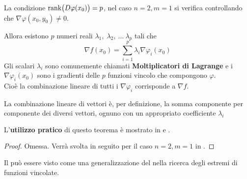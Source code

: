 \begin{theorem}
\begin{note}
	\end{note}
	\begin{note}
		La condizione $\operatorname{rank} \bigl( D\varphi(x_0) \bigr) = p$, nel caso $n = 2, m = 1$ si verifica controllando che $\nabla \varphi (x_0, y_0) \neq 0$.
	\end{note}
	Allora esistono $p$ numeri reali $\lambda_1,\; \lambda_2,\:\dotsc\:\lambda_p$ tali che
	\begin{equation}
		\label{eq:eqiv_nabl_molt_lagr}
		\nabla f(x_0) = \sum\limits_{i = 1}^{p} \lambda_i \nabla \varphi_i (x_0)
	\end{equation}
	Gli scalari $\lambda_i$ sono comunemente chiamati \textbf{Moltiplicatori di Lagrange} e i $\nabla \varphi_i (x_0)$ sono i gradienti delle $p$ funzioni vincolo che compongono $\varphi$.\\
	Cioè la combinazione lineare di tutti i $\nabla \varphi_i$ corrisponde a $\nabla f$.
	\begin{note}
		La combinazione lineare di vettori è, per definizione, la somma componente per componente dei diversi vettori, ognuno con un appropriato coefficiente $\lambda_i$
	\end{note}
	\begin{note}
		L'\textbf{utilizzo pratico} di questo teorema è mostrato in  e .
	\end{note}
	\begin{proof}
		Omessa. Verrà svolta in seguito per il caso $n = 2, m = 1$ in .
	\end{proof}
\end{theorem}
\begin{observation}
	Il  può essere visto come una generalizzazione del  nella ricerca degli estremi di funzioni vincolate.
\end{observation}

